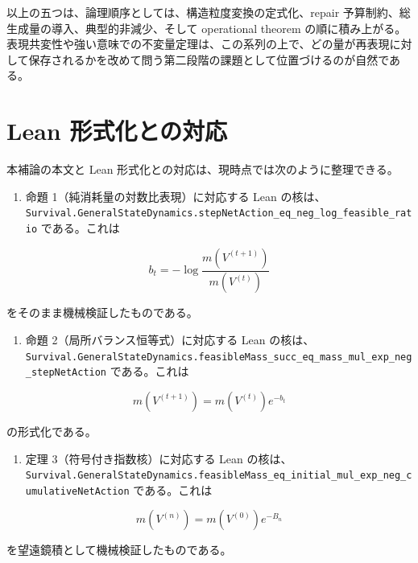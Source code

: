 \documentclass[12pt,a4paper]{article}
\begin{document}
以上の五つは、論理順序としては、構造粒度変換の定式化、repair 予算制約、総生成量の導入、典型的非減少、そして operational theorem の順に積み上がる。表現共変性や強い意味での不変量定理は、この系列の上で、どの量が再表現に対して保存されるかを改めて問う第二段階の課題として位置づけるのが自然である。

\section{Lean 形式化との対応}\label{lean-ux5f62ux5f0fux5316ux3068ux306eux5bfeux5fdc}

本補論の本文と Lean 形式化との対応は、現時点では次のように整理できる。

\begin{enumerate}
\def\labelenumi{\arabic{enumi}.}
\tightlist
\item
  命題 1（純消耗量の対数比表現）に対応する Lean の核は、\texttt{Survival.GeneralStateDynamics.stepNetAction\_eq\_neg\_log\_feasible\_ratio} である。これは
\end{enumerate}

\[
b_{t} = -\log \frac{m(V^{(t+1)})}{m(V^{(t)})}
\]

をそのまま機械検証したものである。

\begin{enumerate}
\def\labelenumi{\arabic{enumi}.}
\setcounter{enumi}{1}
\tightlist
\item
  命題 2（局所バランス恒等式）に対応する Lean の核は、\texttt{Survival.GeneralStateDynamics.feasibleMass\_succ\_eq\_mass\_mul\_exp\_neg\_stepNetAction} である。これは
\end{enumerate}

\[
m(V^{(t+1)}) = m(V^{(t)}) e^{-b_{t}}
\]

の形式化である。

\begin{enumerate}
\def\labelenumi{\arabic{enumi}.}
\setcounter{enumi}{2}
\tightlist
\item
  定理 3（符号付き指数核）に対応する Lean の核は、\texttt{Survival.GeneralStateDynamics.feasibleMass\_eq\_initial\_mul\_exp\_neg\_cumulativeNetAction} である。これは
\end{enumerate}

\[
m(V^{(n)}) = m(V^{(0)}) e^{-B_{n}}
\]

を望遠鏡積として機械検証したものである。
\end{document}
